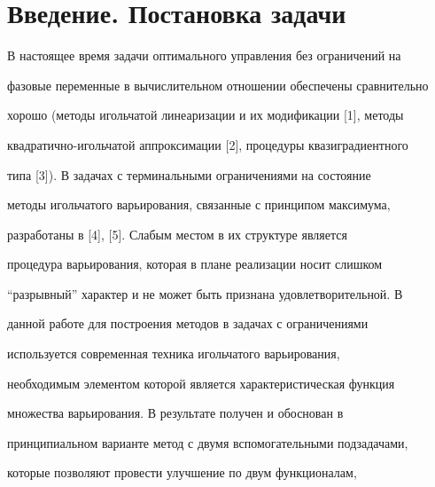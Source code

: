 \pagestyle{plain} %


 


 




 


\maketitle 


\label{begin} 


 


\section{Введение. Постановка задачи} 


 


В настоящее время задачи оптимального управления без ограничений на 


фазовые переменные в вычислительном отношении обеспечены сравнительно 


хорошо (методы игольчатой линеаризации и их модификации [1], методы 


квадратично-игольчатой аппроксимации [2], процедуры квазиградиентного 


типа [3]). В задачах с терминальными ограничениями на состояние 


методы игольчатого варьирования, связанные с принципом максимума, 


разработаны в [4], [5]. Слабым местом в их структуре является 


процедура варьирования, которая в плане реализации носит слишком 


``разрывный'' характер и не может быть признана удовлетворительной. В 


данной работе для построения методов в задачах с ограничениями 


используется современная техника игольчатого варьирования, 


необходимым элементом которой является характеристическая функция 


множества варьирования. В результате получен и обоснован в 


принципиальном варианте метод с двумя вспомогательными подзадачами, 


которые позволяют провести улучшение по двум функционалам, 


